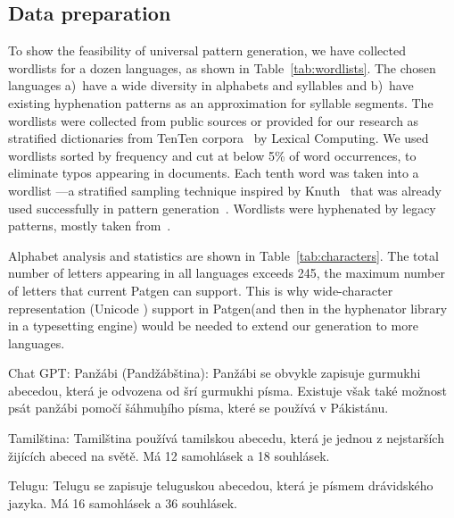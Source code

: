 \documentclass{csbulletin}
\let\program=\textrm %
\let\acro\relax
\providecommand\Dash{---}
\newcommand{\Patgen}{\program{Patgen}\xspace}
\begin{document}
\subsection{Data preparation}
To show the feasibility of universal pattern generation, we have collected wordlists for a dozen languages, as shown in Table~\ref{tab:wordlists}. 
The chosen languages \textrm{a)}~have a wide diversity in alphabets and syllables and \textrm{b)}~have existing hyphenation patterns as an approximation for syllable segments.
The wordlists were collected from public sources or provided for our research as stratified dictionaries from TenTen corpora~\cite{nlp:Jakubicek2013TTC} by Lexical Computing.
We used wordlists sorted by frequency and cut at below 5\% of word occurrences, to eliminate typos appearing in documents.
Each tenth word was taken into a wordlist \Dash a stratified sampling technique inspired by Knuth~\cite{tex:knuth91} that was already used successfully in pattern generation~\cite{tex:sojka95b}.
Wordlists were hyphenated by legacy patterns, mostly taken from~\cite{tex:hyphenationweb-2023-07-05}.

Alphabet analysis and statistics are shown in Table~\ref{tab:characters}.
The total number of letters appearing in all languages exceeds 245, the maximum number of letters that current \Patgen can support.
This is why wide-character representation (Unicode \mbox{\acro{UTF-16}}) support in \Patgen (and then in the hyphenator library in a typesetting engine) would be needed to extend our generation to more languages.

\iffalse
Chat GPT:
Panžábi (Pandžábština): Panžábi se obvykle zapisuje gurmukhi abecedou, která je odvozena od šrí gurmukhi písma. Existuje však také možnost psát panžábi pomočí šáhmuḫího písma, které se používá v Pákistánu.

Tamilština: Tamilština používá tamilskou abecedu, která je jednou z nejstarších žijících abeced na světě. Má 12 samohlásek a 18 souhlásek.

Telugu: Telugu se zapisuje teluguskou abecedou, která je písmem drávidského jazyka. Má 16 samohlásek a 36 souhlásek.
\end{document}
